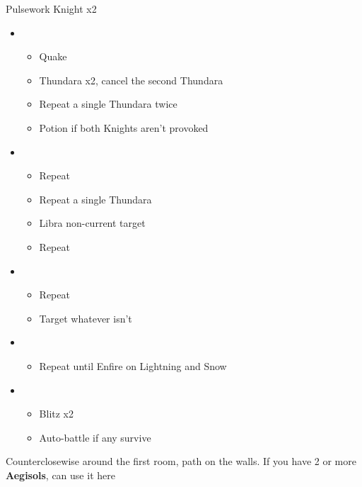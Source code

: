 \documentclass{report}
\begin{document}
\begin{battle}{Pulsework Knight x2}
\begin{itemize}
    \item \first
    \begin{itemize}
        \item Quake
        \item Thundara x2, cancel the second Thundara
        \item Repeat a single Thundara twice
        \item Potion if both Knights aren't provoked
    \end{itemize}
    \item \third
    \begin{itemize}
        \item Repeat
        \item Repeat a single Thundara
        \item Libra non-current target
        \item Repeat
    \end{itemize}
    \item \fourth
    \begin{itemize}
        \item Repeat
        \item Target whatever isn't \stagger
    \end{itemize}
    \item \fifth
    \begin{itemize}
        \item Repeat until Enfire on Lightning and Snow
    \end{itemize}
    \item \sixth
    \begin{itemize}
        \item Blitz x2
        \item Auto-battle if any survive
    \end{itemize}
\end{itemize}
\end{battle}
Counterclosewise around the first room, path on the walls.
\newpage
If you have 2 or more \textbf{Aegisols}, can use it here
\end{document}
